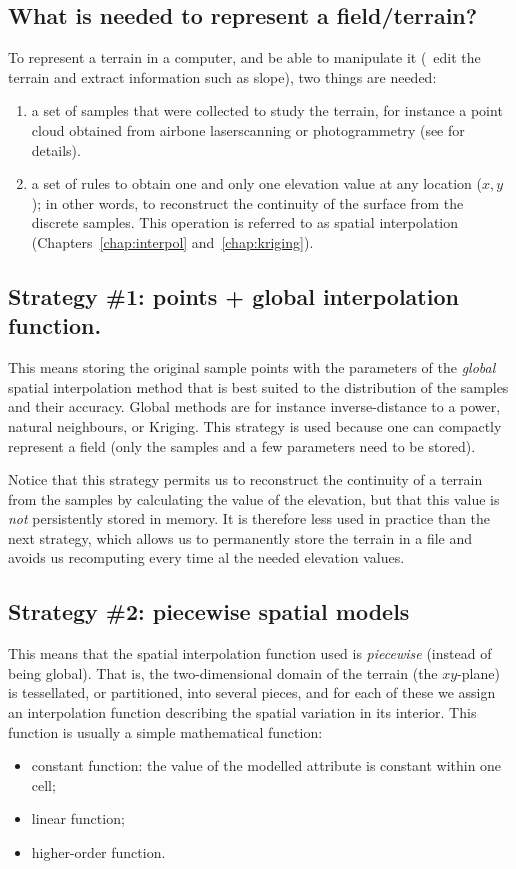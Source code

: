 \subsection{What is needed to represent a field/terrain?}

To represent a terrain in a computer, and be able to manipulate it (\ie\ edit the terrain and extract information such as slope), two things are needed:
\begin{enumerate}
  \item a set of samples that were collected to study the terrain, for instance a point cloud obtained from airbone laserscanning or photogrammetry (see  for details).
  \item a set of rules to obtain one and only one elevation value at any location ($x,y$); in other words, to reconstruct the continuity of the surface from the discrete samples.
  This operation is referred to as spatial interpolation (Chapters~\ref{chap:interpol} and~\ref{chap:kriging}). 
\end{enumerate}


\subsection{Strategy \#1: points + global interpolation function.}
This means storing the original sample points with the parameters of the \emph{global} spatial interpolation method that is best suited to the distribution of the samples and their accuracy.
Global methods are for instance inverse-distance to a power, natural neighbours, or Kriging.
This strategy is used because one can compactly represent a field (only the samples and a few parameters need to be stored).

Notice that this strategy permits us to reconstruct the continuity of a terrain from the samples by calculating the value of the elevation, but that this value is \emph{not} persistently stored in memory.
It is therefore less used in practice than the next strategy, which allows us to permanently store the terrain in a file and avoids us recomputing every time al the needed elevation values.


\subsection{Strategy \#2: piecewise spatial models}
This means that the spatial interpolation function used is \emph{piecewise} (instead of being global).
That is, the two-dimensional domain of the terrain (the $xy$-plane) is tessellated, or partitioned, into several pieces, and for each of these we assign an interpolation function describing the spatial variation in its interior.
This function is usually a simple mathematical function:
\begin{itemize}
  \item constant function: the value of the modelled attribute is constant within one cell;
  \item linear function;
  \item higher-order function.
\end{itemize}

